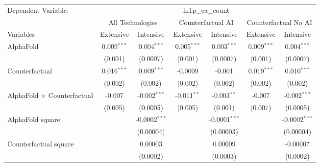 \begingroup
\centering
\begin{tabular}{lcccccc}
   \tabularnewline \midrule \midrule
   Dependent Variable: & \multicolumn{6}{c}{ln1p\_ca\_count}\\
 & \multicolumn{2}{c}{All Technologies} & \multicolumn{2}{c}{Counterfactual AI} & \multicolumn{2}{c}{Counterfactual No AI} \\
\cmidrule(lr){1-1}\cmidrule(lr){2-3} \cmidrule(lr){4-5} \cmidrule(lr){6-7}
Variables & \multicolumn{1}{c}{Extensive} & \multicolumn{1}{c}{Intensive} & \multicolumn{1}{c}{Extensive} & \multicolumn{1}{c}{Intensive} & \multicolumn{1}{c}{Extensive} & \multicolumn{1}{c}{Intensive} \\
\cmidrule(lr){1-1}\cmidrule(lr){2-2} \cmidrule(lr){3-3} \cmidrule(lr){4-4} \cmidrule(lr){5-5} \cmidrule(lr){6-6} \cmidrule(lr){7-7}
   AlphaFold                          & 0.009$^{***}$ & 0.004$^{***}$    & 0.005$^{***}$ & 0.003$^{***}$   & 0.009$^{***}$ & 0.004$^{***}$\\   
                                      & (0.001)       & (0.0007)         & (0.001)       & (0.0007)        & (0.001)       & (0.0007)\\   
   Counterfactual                     & 0.016$^{***}$ & 0.009$^{***}$    & -0.0009       & -0.001          & 0.019$^{***}$ & 0.010$^{***}$\\   
                                      & (0.002)       & (0.002)          & (0.002)       & (0.002)         & (0.002)       & (0.002)\\   
   AlphaFold $\times$ Counterfactual  & -0.007        & -0.002$^{***}$   & -0.011$^{**}$ & -0.003$^{**}$   & -0.007        & -0.002$^{***}$\\   
                                      & (0.005)       & (0.0005)         & (0.005)       & (0.001)         & (0.007)       & (0.0005)\\   
   AlphaFold square                   &               & -0.0002$^{***}$  &               & -0.0001$^{***}$ &               & -0.0002$^{***}$\\   
                                      &               & (0.00004)        &               & (0.00003)       &               & (0.00004)\\   
   Counterfactual square              &               & 0.00003          &               & 0.00009         &               & -0.00007\\   
                                      &               & (0.0002)         &               & (0.0003)        &               & (0.0002)\\   

\end{tabular}
